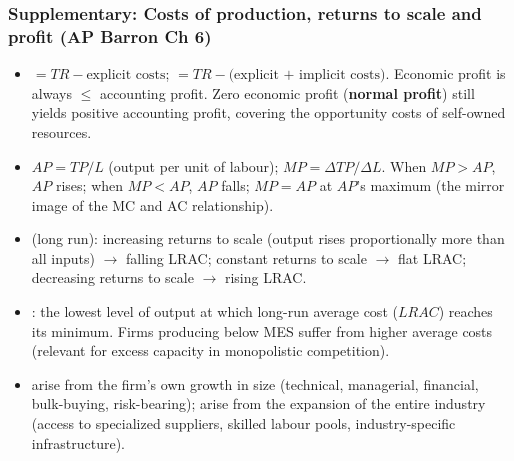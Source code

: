 \subsubsection*{Supplementary: Costs of production, returns to scale and profit (AP Barron Ch 6)}
\begin{itemize}
  \item {} $= TR - \text{explicit costs}$;  $= TR - \text{(explicit + implicit costs)}$. Economic profit is always $\leq$ accounting profit. Zero economic profit (\textbf{normal profit}) still yields positive accounting profit, covering the opportunity costs of self-owned resources.
  \item {} $AP = TP/L$ (output per unit of labour);  $MP = \Delta TP/\Delta L$. When $MP > AP$, $AP$ rises; when $MP < AP$, $AP$ falls; $MP = AP$ at $AP$'s maximum (the mirror image of the MC and AC relationship).
  \item {} (long run): increasing returns to scale (output rises proportionally more than all inputs) $\to$ falling LRAC; constant returns to scale $\to$ flat LRAC; decreasing returns to scale $\to$ rising LRAC.
  \item {}: the lowest level of output at which long-run average cost ($LRAC$) reaches its minimum. Firms producing below MES suffer from higher average costs (relevant for excess capacity in monopolistic competition).
  \item {} arise from the firm's own growth in size (technical, managerial, financial, bulk-buying, risk-bearing);  arise from the expansion of the entire industry (access to specialized suppliers, skilled labour pools, industry-specific infrastructure).
\end{itemize}
